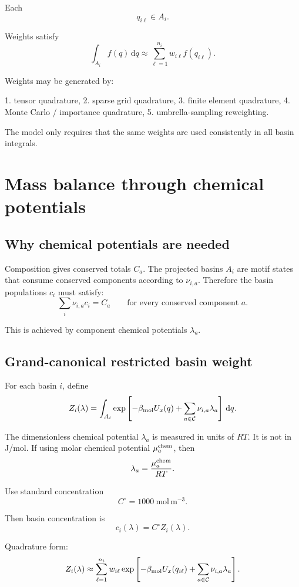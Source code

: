 \documentclass[11pt]{article}
\newcommand{\dd}{\,\mathrm d}
\begin{document}
  Each
  \[
  q_{i\ell}\in A_i.
  \]

  Weights satisfy
  \[
  \int_{A_i} f(q)\dd q
  \approx
  \sum_{\ell=1}^{n_i}w_{i\ell}f(q_{i\ell}).
  \]

  Weights may be generated by:

  1. tensor quadrature,
  2. sparse grid quadrature,
  3. finite element quadrature,
  4. Monte Carlo / importance quadrature,
  5. umbrella-sampling reweighting.

  The model only requires that the same weights are used consistently in all
  basin integrals.

  \section{Mass balance through chemical potentials}

  \subsection{Why chemical potentials are needed}

  Composition gives conserved totals \(C_a\). The projected basins \(A_i\) are
  motif states that consume conserved components according to \(\nu_{i,a}\).
  Therefore the basin populations \(c_i\) must satisfy:
  \[
  \sum_i\nu_{i,a}c_i=C_a
  \qquad
  \text{for every conserved component }a.
  \]

  This is achieved by component chemical potentials \(\lambda_a\).

  \subsection{Grand-canonical restricted basin weight}

  For each basin \(i\), define
  \[
  Z_i(\lambda)
  =
  \int_{A_i}
  \exp
  \left[
  -\beta_{\rm mol}U_x(q)
  +
  \sum_{a\in\mathcal C}\nu_{i,a}\lambda_a
  \right]\dd q.
  \]

  The dimensionless chemical potential \(\lambda_a\) is measured in units of
  \(RT\). It is not in J/mol. If using molar chemical potential
  \(\mu_a^{\rm chem}\), then
  \[
  \lambda_a=\frac{\mu_a^{\rm chem}}{RT}.
  \]

  Use standard concentration
  \[
  C^\circ=1000\ \mathrm{mol\,m^{-3}}.
  \]

  Then basin concentration is
  \[
  c_i(\lambda)=C^\circ Z_i(\lambda).
  \]

  Quadrature form:
  \[
  Z_i(\lambda)
  \approx
  \sum_{\ell=1}^{n_i}
  w_{i\ell}
  \exp
  \left[
  -\beta_{\rm mol}U_x(q_{i\ell})
  +
  \sum_{a\in\mathcal C}\nu_{i,a}\lambda_a
  \right].
  \]
\end{document}
